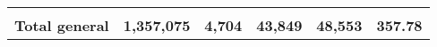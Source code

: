 \begin{tabular}{lrcclr}
	& \multicolumn{1}{l}{}                                           & \multicolumn{1}{l}{}                                       & \multicolumn{1}{l}{} &                                                                     & \multicolumn{1}{l}{}                                                         \\
	\rowcolor[HTML]{DDEBF7} 
	\textbf{Total   general}                                       & \textbf{1,357,075}                                             & \multicolumn{1}{r}{\cellcolor[HTML]{DDEBF7}\textbf{4,704}} & \textbf{43,849}      & \textbf{48,553}                                                     & \textbf{357.78}                                                             
\end{tabular}